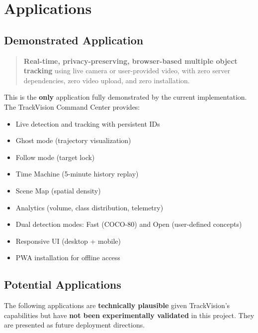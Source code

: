 \chapter{Applications}
\label{ch:applications}

\section{Demonstrated Application}
\label{sec:demo-app}

\begin{quote}
\textbf{Real-time, privacy-preserving, browser-based multiple object tracking} using live camera or user-provided video, with zero server dependencies, zero video upload, and zero installation.
\end{quote}

This is the \textbf{only} application fully demonstrated by the current implementation. The TrackVision Command Center provides:
\begin{itemize}
    \item Live detection and tracking with persistent IDs
    \item Ghost mode (trajectory visualization)
    \item Follow mode (target lock)
    \item Time Machine (5-minute history replay)
    \item Scene Map (spatial density)
    \item Analytics (volume, class distribution, telemetry)
    \item Dual detection modes: Fast (COCO-80) and Open (user-defined concepts)
    \item Responsive UI (desktop + mobile)
    \item PWA installation for offline access
\end{itemize}

\section{Potential Applications}
\label{sec:potential-apps}

The following applications are \textbf{technically plausible} given TrackVision's capabilities but have \textbf{not been experimentally validated} in this project. They are presented as future deployment directions.

